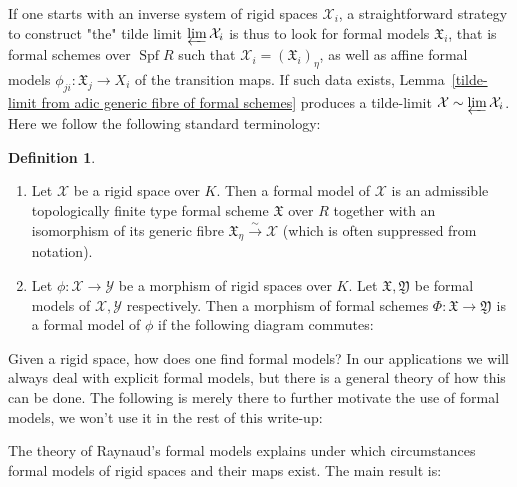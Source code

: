 \documentclass[11pt,oneside]{amsart}
\theoremstyle{definition}
\newtheorem{definition}[theorem]{Definition}
\theoremstyle{remark}
\begin{document}
	If one starts with an inverse system of rigid spaces $\mathcal X_i$, a straightforward strategy to construct "the" tilde limit $\varprojlim \mathcal X_i$ is thus to look for formal models $\mathfrak X_i$, that is formal schemes over $\operatorname{Spf} R$ such that $\mathcal X_i = (\mathfrak X_i)_\eta$, as well as affine formal models $\phi_{ji}:\mathfrak X_j\rightarrow X_i$ of the transition maps. If such data exists, Lemma~\ref{tilde-limit from adic generic fibre of formal schemes} produces a tilde-limit $\mathcal X \sim \varprojlim \mathcal X_i$. Here we follow the following standard terminology:
	\begin{definition}
		\begin{enumerate}
			\item Let $\mathcal X$ be a rigid space over $K$. Then a formal model of $\mathcal X$ is an admissible topologically finite type formal scheme $\mathfrak X$ over $R$ together with an isomorphism of its generic fibre $\mathfrak X_\eta \xrightarrow{\sim} \mathcal X$ (which is often suppressed from notation).
			\item Let $\phi:\mathcal X\rightarrow \mathcal Y$ be a morphism of rigid spaces over $K$. Let $\mathfrak X,\mathfrak Y$ be formal models of $\mathcal X,\mathcal Y$ respectively. Then a morphism of formal schemes $\Phi:\mathfrak X \rightarrow \mathfrak Y$ is a formal model of $\phi$ if the following diagram commutes:
			\begin{center}
			\end{center}
			
		\end{enumerate}
		
	\end{definition}	
	Given a rigid space, how does one find formal models? In our applications we will always deal with explicit formal models, but there is a general theory of how this can be done. The following is merely there to further motivate the use of formal models, we won't use it in the rest of this write-up:
	
	The theory of Raynaud's formal models explains under which circumstances formal models of rigid spaces and their maps exist. The main result is:
	
\end{document}
